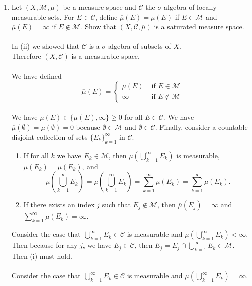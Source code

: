 \begin{enumerate}
\begin{enumerate}[label=(\roman*),align=left]
\begin{enumerate}[label=(\roman*),align=left]
		\end{enumerate}
		\item Let $(X,\mathcal{M},\mu)$ be a measure space and $\mathcal{C}$ the $\sigma$-algebra of locally measurable sets.
		For $E\in\mathcal{C}$, define $\overline\mu(E)=\mu(E)$ if $E\in\mathcal{M}$ and $\overline\mu(E)=\infty$ if $E\notin\mathcal{M}$.
		Show that $(X,\mathcal{C},\overline\mu)$ is a saturated measure space.\\
		\\In (ii) we showed that $\mathcal{C}$ is a $\sigma$-algebra of subsets of $X$.\\
		Therefore $(X,\mathcal{C})$ is a measurable space.\\
		\\We have defined
		\[
			\overline\mu(E)=
			\begin{cases}
				\mu(E)&\text{ if }E\in\mathcal{M}\\
				\infty&\text{ if }E\notin\mathcal{M}
			\end{cases}	
		\]
		\\We have $\overline\mu(E)\in\{\mu(E),\infty\}\ge0$ for all $E\in\mathcal{C}$.
		We have $\overline\mu(\emptyset)=\mu(\emptyset)=0$ because $\emptyset\in\mathcal{M}$ and $\emptyset\in\mathcal{C}$.
		Finally, consider a countable disjoint collection of sets $\{E_k\}_{k=1}^\infty$ in $\mathcal{C}$.
		\begin{enumerate}[label=(\roman*),align=left]  
			\item If for all $k$ we have $E_k\in\mathcal{M}$, then $\mu(\bigcup_{k=1}^\infty E_k)$ is measurable, $\overline\mu(E_k)=\mu(E_k)$, and
			\[
				\overline\mu(\bigcup_{k=1}^\infty E_k)=\mu(\bigcup_{k=1}^\infty E_k)=\sum_{k=1}^\infty \mu(E_k)=\sum_{k=1}^\infty \overline\mu(E_k).
			\]
			\item If there exists an index $j$ such that $E_j\notin\mathcal{M}$, then $\overline\mu(E_j)=\infty$ and $\sum_{k=1}^\infty \overline\mu(E_k)=\infty$.
		\end{enumerate}
		Consider the case that $\bigcup_{k=1}^\infty E_k\in\mathcal{C}$ is measurable and $\mu(\bigcup_{k=1}^\infty E_k)<\infty$. 
		\\Then because for any $j$, we have $E_j\in\mathcal{C}$, then $E_j=E_j\cap\bigcup_{k=1}^\infty E_k\in\mathcal{M}$.\\
		Then (i) must hold.\\
		\\Consider the case that $\bigcup_{k=1}^\infty E_k\in\mathcal{C}$ is measurable and $\mu(\bigcup_{k=1}^\infty E_k)=\infty$. \\

\end{enumerate}
\end{enumerate}
